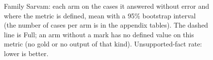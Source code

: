 \begin{figure}[!t]
\caption{Family Sarvam: each arm on the cases it answered without error and where the metric is defined, mean with a 95\% bootstrap interval (the number of cases per arm is in the appendix tables). The dashed line is Full; an arm without a mark has no defined value on this metric (no gold or no output of that kind). Unsupported-fact rate: lower is better.}
\label{fig:main_sarvam}
\end{figure}